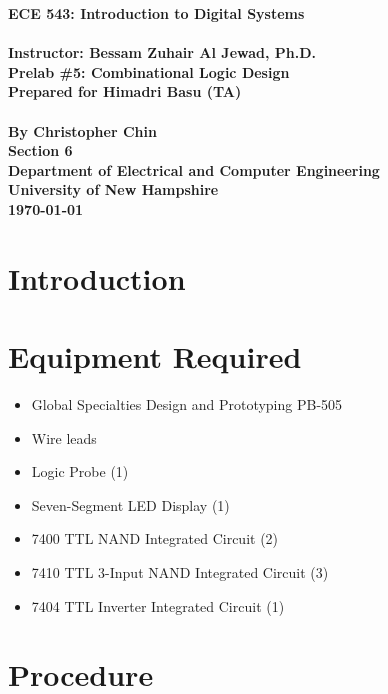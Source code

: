 \documentclass[11pt,a4paper]{article}
\begin{document}
\begin{center}
\textbf{
    \Large{ECE 543: Introduction to Digital Systems}
    \\~\\
    \large{Instructor: Bessam Zuhair Al Jewad, Ph.D.}
    \\[1.25in]
    \LARGE{Prelab \#5: Combinational Logic Design}
    \\[0.62in]
    \large{Prepared for Himadri Basu (TA)\\~\\By Christopher Chin}
    \\[1.25in]
    \LARGE{Section 6}
    \\[1.25in]
    \Large{Department of Electrical and Computer Engineering\\
           University of New Hampshire}
    \\[1.25in]
    \Large{\today}
}
\end{center}
\clearpage
{}

\tableofcontents
\pagebreak

\section{Introduction}
\section{Equipment Required}
\begin{itemize}
    \item Global Specialties Design and Prototyping PB-505
    \item Wire leads
    \item Logic Probe (1)
    \item Seven-Segment LED Display (1)
    \item 7400 TTL NAND Integrated Circuit (2)
    \item 7410 TTL 3-Input NAND Integrated Circuit (3)
    \item 7404 TTL Inverter Integrated Circuit (1)
\end{itemize}
\section{Procedure}
\end{document}
